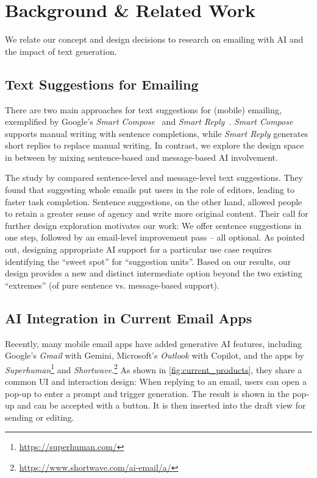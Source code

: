 


\section{Background \& Related Work}\label{sec:related_work}




We relate our concept and design decisions to research on emailing with AI and the impact of text generation.


\subsection{Text Suggestions for Emailing}

There are two main approaches for text suggestions for (mobile) emailing, exemplified by 
Google's \textit{Smart Compose}~\cite{Chen2019smartcompose} and \textit{Smart Reply}~\cite{Kannan2016smartreply}. \textit{Smart Compose} supports manual writing with sentence completions, while \textit{Smart Reply} generates short replies to replace manual writing. In contrast, we explore the design space in between by mixing sentence-based and message-based AI involvement. %



The study by \citet{Fu2023sentencevsmessage} compared sentence-level and message-level text suggestions. They found that suggesting whole emails put users in the role of editors, leading to faster task completion. Sentence suggestions, on the other hand, allowed people to retain a greater sense of agency and write more original content. Their call for further design exploration motivates our work: We offer sentence suggestions in one step, followed by an email-level improvement pass -- all optional. %
As \citet{Fu2023sentencevsmessage} pointed out, designing appropriate AI support for a particular use case requires identifying the ``sweet spot'' for ``suggestion units''. Based on our results, our design provides a new and distinct intermediate option beyond the two existing ``extremes'' (of pure sentence vs. message-based support). %



\subsection{AI Integration in Current Email Apps}\label{sec:related_work_current_products}



Recently, many mobile email apps have added generative AI features, including Google's \textit{Gmail} with Gemini, Microsoft's \textit{Outlook} with Copilot, and the apps by \textit{Superhuman}\footnote{\url{https://superhuman.com/}} and \textit{Shortwave}.\footnote{\url{https://www.shortwave.com/ai-email/a/}}
As shown in \cref{fig:current_products}, they share a common UI and interaction design: When replying to an email, users can open a pop-up to enter a prompt and trigger generation. The result is shown in the pop-up and can be accepted with a button. It is then inserted into the draft view for sending or editing.

